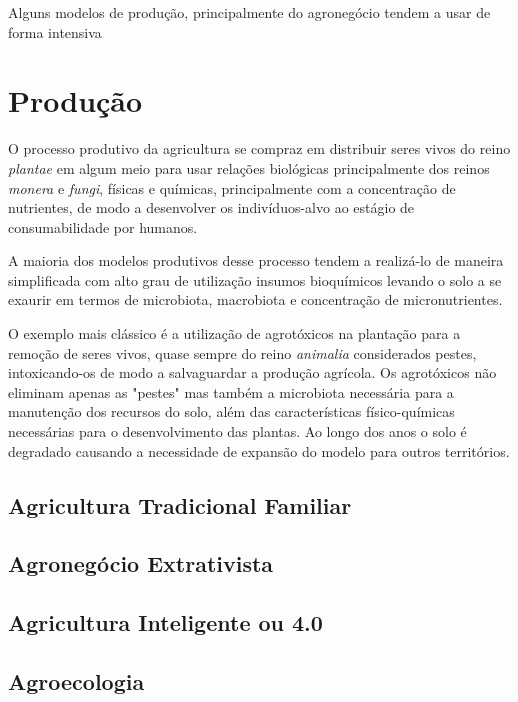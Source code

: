 \documentclass[]{article}
\begin{document}
Alguns modelos de produção, principalmente do agronegócio tendem a usar de forma intensiva 

\section{Produção}

O processo produtivo da agricultura se compraz em distribuir seres vivos do reino \textit{plantae} em algum meio para usar relações biológicas principalmente dos reinos \textit{monera} e \textit{fungi}, físicas e químicas, principalmente com a concentração de nutrientes, de modo a desenvolver os indivíduos-alvo ao estágio de consumabilidade por humanos. 

A maioria dos modelos produtivos desse processo tendem a realizá-lo de maneira simplificada com alto grau de utilização insumos bioquímicos levando o solo a se exaurir em termos de microbiota, macrobiota e concentração de micronutrientes. 

O exemplo mais clássico é a utilização de agrotóxicos na plantação para a remoção de seres vivos, quase sempre do reino \textit{animalia} considerados pestes, intoxicando-os de modo a salvaguardar a produção agrícola. Os agrotóxicos não eliminam apenas as "pestes" mas também a microbiota necessária para a manutenção dos recursos do solo, além das características físico-químicas necessárias para o desenvolvimento das plantas. Ao longo dos anos o solo é degradado causando a necessidade de expansão do modelo para outros territórios.

\subsection{Agricultura Tradicional Familiar}

\subsection{Agronegócio Extrativista}

\subsection{Agricultura Inteligente ou 4.0}

\subsection{Agroecologia}
\end{document}
